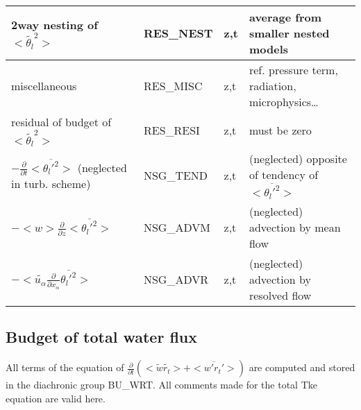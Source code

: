 \begin{longtable}[c]{|p{}|p{}|p{}|p{}|}
{\rm 2way nesting of }$<\tilde{\theta_l}^2>$                             & RES\_NEST  & z,t & average from smaller nested models \\\hline
{\rm miscellaneous}                                                      & RES\_MISC  & z,t & ref. pressure term, radiation, microphysics\ldots \\\hline
{\rm residual of budget of} $<\tilde{\theta_l}^2>$                       & RES\_RESI  & z,t & must be zero \\\hline
$-\frac{\partial }{\partial t}<\overline{\theta_l'^2}>$ (neglected in turb. scheme)& NSG\_TEND & z,t & (neglected) opposite of tendency of $<\overline{\theta_l'^2}>$ \\\hline
$-<w>\frac{\partial}{\partial z}<\overline{\theta_l'^2}>$                & NSG\_ADVM  & z,t & (neglected) advection by mean flow \\\hline
$-<\tilde{u_\alpha}\frac{\partial}{\partial x_\alpha}\overline{\theta_l'^2}>$ & NSG\_ADVR & z,t & (neglected) advection by resolved flow \\\hline
\end{longtable}
\endgroup



\subsection{Budget of total water flux}

All terms of the equation of $\frac{\partial}{\partial t} (<\tilde{w}\tilde{r_t}> + <\overline{w'r_t'}>)$ are
computed and stored in the diachronic group BU\_WRT. 
All comments made for the total Tke equation are valid here.\\

